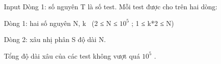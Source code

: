 Input
Dòng 1: số nguyên T là số test. Mỗi test được cho trên hai dòng:  

   Dòng 1: hai số nguyên N, k  (2 ≤ N ≤ $10^{5}$   ; 1 ≤ k*2 ≤ N)  

   Dòng 2: xâu nhị phân S độ dài N.  

   Tổng độ dài xâu của các test không vượt quá $10^{5}$   .